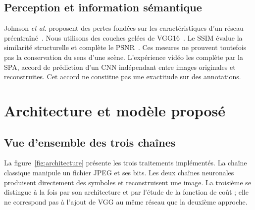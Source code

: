 \documentclass[conference]{IEEEtran}
\begin{document}
\subsection{Perception et information sémantique}
Johnson \textit{et al.} proposent des pertes fondées sur les
caractéristiques d'un réseau préentraîné~\cite{perceptual}. Nous
utilisons des couches gelées de VGG16~\cite{vgg}. Le SSIM évalue la
similarité structurelle et complète le PSNR~\cite{ssim}. Ces mesures
ne prouvent toutefois pas la conservation du sens d'une scène.
L'expérience vidéo les complète par la SPA, accord de prédiction
d'un CNN indépendant entre images originales et reconstruites.
Cet accord ne constitue pas une exactitude sur des annotations.

\section{Architecture et modèle proposé}
\label{sec:model}
\subsection{Vue d'ensemble des trois chaînes}
La figure~\ref{fig:architecture} présente les trois traitements
implémentés. La chaîne classique manipule un fichier JPEG et ses bits.
Les deux chaînes neuronales produisent directement des symboles et
reconstruisent une image. La troisième se distingue à la fois par son
architecture et par l'étude de la fonction de coût ; elle ne correspond
pas à l'ajout de VGG au même réseau que la deuxième approche.
\end{document}

